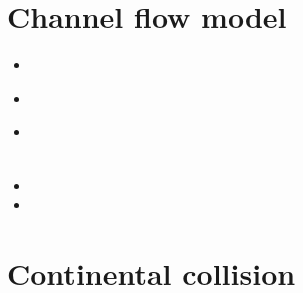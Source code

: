 \section{Channel flow model} 

\begin{scriptsize}
\begin{itemize}
\item[\twothousand] 
\item[\twothousandfour] 
 \\
\item[\twothousandsix] 
 \\
 \\
\item[\twothousandseven] 
\item[\twothousandeleven] 
\end{itemize}
\end{scriptsize}

\section{Continental collision} 


